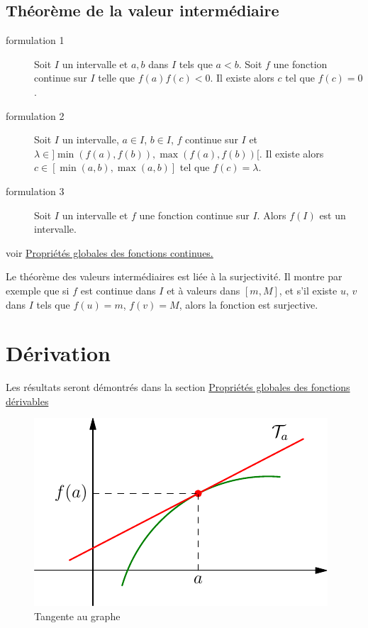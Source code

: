\subsection{Théorème de la valeur intermédiaire}
\begin{thm}
 \begin{description}
  \item[formulation 1]Soit $I$ un intervalle et $a, b$ dans $I$ tels que $a<b$. Soit $f$ une fonction continue sur $I$ telle que $f(a)f(c)<0$. Il existe alors $c$ tel que $f(c)=0$.
  \item[formulation 2]Soit $I$ un intervalle, $a\in I$, $b\in I$, $f$ continue sur $I$ et $\lambda \in ]\min(f(a),f(b)),\max(f(a),f(b))[$. Il existe alors $c\in[\min(a,b),\max(a,b)]$ tel que $f(c)=\lambda$.
  \item[formulation 3]Soit $I$ un intervalle et $f$ une fonction continue sur $I$. Alors $f(I)$ est un intervalle.
 \end{description}
\end{thm}
voir \href{\baseurl C2072.pdf}{Propriétés globales des fonctions continues.}
\begin{rem}
Le théorème des valeurs intermédiaires est liée à la surjectivité. Il montre par exemple que si $f$ est continue dans $I$ et à valeurs dans $[m,M]$, et s'il existe $u$, $v$ dans $I$ tels que $f(u)=m$, $f(v) = M$, alors la fonction est surjective. 
\end{rem}

\section{Dérivation}
Les résultats seront démontrés dans la section \href{\baseurl C2070.pdf}{Propriétés globales des fonctions dérivables}
\begin{figure}[h]
 \centering
 \includegraphics{./C2004_tan.pdf}
 \caption{Tangente au graphe}
 \label{fig:tan}
\end{figure}

